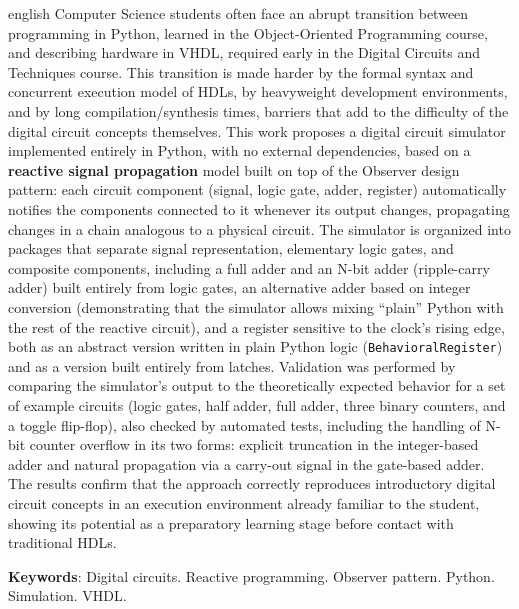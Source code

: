 \documentclass[12pt, a4paper, oneside]{abntex2}
\begin{document}
\begin{resumo}[Abstract]
 \begin{otherlanguage*}{english}
Computer Science students often face an abrupt transition between programming in Python, learned in the Object-Oriented Programming course, and describing hardware in VHDL, required early in the Digital Circuits and Techniques course. This transition is made harder by the formal syntax and concurrent execution model of HDLs, by heavyweight development environments, and by long compilation/synthesis times, barriers that add to the difficulty of the digital circuit concepts themselves. This work proposes a digital circuit simulator implemented entirely in Python, with no external dependencies, based on a \textbf{reactive signal propagation} model built on top of the Observer design pattern: each circuit component (signal, logic gate, adder, register) automatically notifies the components connected to it whenever its output changes, propagating changes in a chain analogous to a physical circuit. The simulator is organized into packages that separate signal representation, elementary logic gates, and composite components, including a full adder and an N-bit adder (ripple-carry adder) built entirely from logic gates, an alternative adder based on integer conversion (demonstrating that the simulator allows mixing ``plain'' Python with the rest of the reactive circuit), and a register sensitive to the clock's rising edge, both as an abstract version written in plain Python logic (\texttt{BehavioralRegister}) and as a version built entirely from latches. Validation was performed by comparing the simulator's output to the theoretically expected behavior for a set of example circuits (logic gates, half adder, full adder, three binary counters, and a toggle flip-flop), also checked by automated tests, including the handling of N-bit counter overflow in its two forms: explicit truncation in the integer-based adder and natural propagation via a carry-out signal in the gate-based adder. The results confirm that the approach correctly reproduces introductory digital circuit concepts in an execution environment already familiar to the student, showing its potential as a preparatory learning stage before contact with traditional HDLs.

\vspace{\onelineskip}
\noindent
\textbf{Keywords}: Digital circuits. Reactive programming. Observer pattern. Python. Simulation. VHDL.
 \end{otherlanguage*}
\end{resumo}
\end{document}
